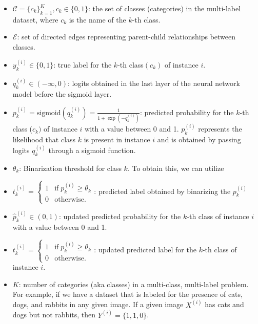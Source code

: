\documentclass[preprint,3p,times, review]{elsarticle}
\begin{document}
\begin{itemize}

    \item  $\mathcal{C} = \{c_k\}_{k=1}^{K} , c_k \in \{0,1\} $: the set of classes (categories) in the multi-label dataset, where $c_k $ is the name of the $k $-th class.

    \item  $\mathcal{E} $: set of directed edges representing parent-child relationships between classes.

    \item  $y_k^{(i)} \in \{0,1\} $: true label for the $k $-th class$(c_k) $ of instance $i $.

    \item  $q_k^{(i)} \in \left( -\infty,0 \right) $: logits obtained in the last layer of the neural network model before the sigmoid layer.

    \item  $p_k^{(i)} = \text{sigmoid}\left(q_k^{(i)}\right) = \frac{1}{1+\exp{\left(-q_k^{(i)}\right)}} $: predicted probability for the $k $-th class ($c_k) $ of instance $i $ with a value between 0 and 1. $p_k^{(i)} $ represents the likelihood that class $k $ is present in instance $i $ and is obtained by passing logits $q_k^{(i)} $ through a sigmoid function.

    \item  $\theta_k $: Binarization threshold for class $k $. To obtain this, we can utilize

    \item  $t_k^{(i)}=\left\{\begin{array}{lc}1&\text{if}\;p_k^{(i)} \geq \theta_k\\0&\text{otherwise.}\end{array}\right. $: predicted label obtained by binarizing the $p_k^{(i)} $

    \item  ${\widehat p}_k^{(i)} \in (0,1) $: updated predicted probability for the $k $-th class of instance $i $ with a value between 0 and 1.

    \item  $t_k^{(i)}=\left\{\begin{array}{lc}1&\text{if}\;p_k^{(i)}\geq\theta_k\\0&\text{otherwise.}\end{array}\right. $: updated predicted label for the $k $-th class of instance $i $.

    \item  $\ensuremath{K} $: number of categories (aka classes) in a multi-class, multi-label problem. For example, if we have a dataset that is labeled for the presence of cats, dogs, and rabbits in any given image. If a given image $X^{(i)} $ has cats and dogs but not rabbits, then $Y^{(i)} = \{1,1,0\} $.


\end{itemize}
\end{document}
